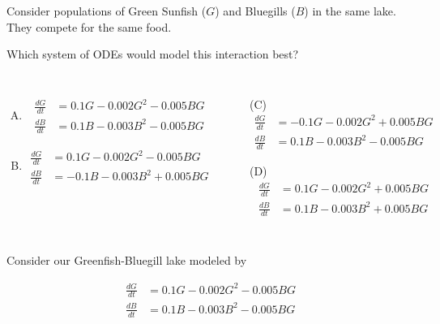 \begin{applicationActivities}

\begin{activity}{10}
Consider populations of Green Sunfish (\(G\)) and Bluegills (\(B\)) in the same lake.  They compete for the same food.

\vfill
Which system of ODEs would model this interaction best?
\begin{columns}
\begin{enumerate}[(A)]
\item 
\begin{alignat*}{2}
\frac{dG}{dt} &= 0.1G-0.002G^2-0.005BG \\
\frac{dB}{dt} &= 0.1B-0.003B^2-0.005BG
\end{alignat*}

\item 
\begin{alignat*}{2}
\frac{dG}{dt} &= 0.1G-0.002G^2-0.005BG \\
\frac{dB}{dt} &= -0.1B-0.003B^2+0.005BG
\end{alignat*}
\end{enumerate}

\begin{enumerate}
\item[(C)]
\begin{alignat*}{2}
\frac{dG}{dt} &= -0.1G-0.002G^2+0.005BG \\
\frac{dB}{dt} &= 0.1B-0.003B^2-0.005BG
\end{alignat*}

\item[(D)]
\begin{alignat*}{2}
\frac{dG}{dt} &= 0.1G-0.002G^2+0.005BG \\
\frac{dB}{dt} &= 0.1B-0.003B^2+0.005BG
\end{alignat*}
\end{enumerate}
\end{columns}


\end{activity}

\begin{activity}{15}
Consider our Greenfish-Bluegill lake modeled by

\begin{alignat*}{2}
\frac{dG}{dt} &= 0.1G-0.002G^2-0.005BG \\
\frac{dB}{dt} &= 0.1B-0.003B^2-0.005BG
\end{alignat*}


\end{activity}
\end{applicationActivities}
